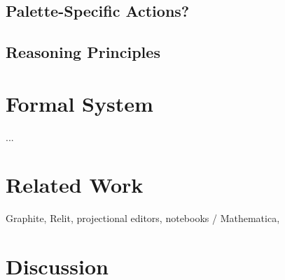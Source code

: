 \documentclass[sigplan,review,anonymous]{acmart}\settopmatter{printfolios=true}
\theoremstyle{slplain}
\numberwithin{thm}{section}
\begin{document}
\subsection{Palette-Specific Actions?}

\subsection{Reasoning Principles}

\section{Formal System}
...

\section{Related Work}
Graphite, Relit, projectional editors, notebooks / Mathematica, 

\section{Discussion}



% 
\end{document}
